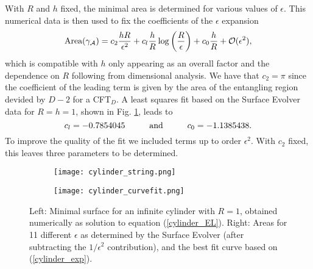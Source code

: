 \documentclass[11 pt]{article}
\begin{document}
With $R$ and $h$ fixed, the minimal area is determined for various values of $\epsilon$. This numerical data is then used to fix the coefficients of the $\epsilon$ expansion
\begin{equation}
    \text{Area}(\gamma_{\cal A}) = c_2\frac{hR}{\epsilon^2} + c_l\frac{h}{R}\log\left(\frac{R}{\epsilon}\right) + c_0\frac{h}{R} + \mathcal{O}(\epsilon^2),
    \label{cylinder_exp}
\end{equation}
which is compatible with $h$ only appearing as an overall factor and the dependence on $R$ following from dimensional analysis.  We have that  $c_2=\pi$ since the coefficient of the leading term is given by the area of the entangling region devided by $D-2$ for a CFT$_D$. 
A least squares fit based on the Surface Evolver data for $R=h=1$, shown in Fig. \ref{fig:cylinder_data}, leads to
\begin{equation}
    c_l=-0.7854045 \hspace{1 cm}\text{and}\hspace{1 cm} c_0=-1.1385438.
    \label{cyl_results}
\end{equation}
To improve the quality of the fit we included terms up to order $\epsilon^2$. With $c_2$ fixed, this leaves three parameters to be determined.

\begin{figure}
     \centering
     \begin{subfigure}[h!]{0.29\textwidth}
         \centering
         \texttt{[image: cylinder\_string.png]}
     \end{subfigure}
     \quad
     \begin{subfigure}[h!]{0.55\textwidth}
         \centering
         \vspace{10 pt}
         \texttt{[image: cylinder\_curvefit.png]}
     \end{subfigure}
        \caption{Left: Minimal surface for an infinite cylinder with $R=1$, obtained numerically as solution to equation (\ref{cylinder_EL}). Right: Areas for 11 different $\epsilon$ as determined by the Surface Evolver (after subtracting the $1/\epsilon^2$ contribution), and the best fit curve based on (\ref{cylinder_exp}).}
        \label{fig:cylinder_data}
\end{figure}
\end{document}
